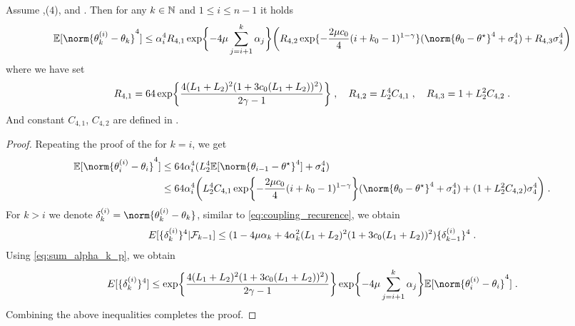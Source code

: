 \begin{lemma}
\label{lem:bound_fourth_moment_difference}
   Assume ,($4$),  and . Then for any $k \in \mathbb{N}$ and $1 \leq i \leq n-1$ it holds  
    \begin{equation}
        \PE[\norm{\theta_k^{(i)}-\theta_k}^4] \leq\alpha_i^4R_{4,1}\exp\biggl\{ -4\mu\sum_{j=i+1}^k\alpha_j\biggr\}\biggl(R_{4,2}\exp\{-\frac{2\mu c_0}{4}(i+k_0-1)^{1-\gamma}\}(\norm{\theta_{0}-\thetas}^4 + \sigma_4^4) + R_{4,3}\sigma_4^4\biggr)
    \end{equation}
    where we have set
    \begin{equation}
    \label{eq:def_R_41_R_42_R_43}
    R_{4,1} = 64\exp\biggl\{ \frac{4(L_1+L_2)^2(1+3c_0(L_1+L_2))^2)}{2\gamma-1}\biggr\}\;, \quad R_{4,2} = L_2^4C_{4,1}\;, \quad R_{4,3} =1+ L_2^2C_{4,2}\;.
    \end{equation}
    And constant $C_{4,1}$, $C_{4,2}$ are defined in .
    \end{lemma}
\begin{proof}
Repeating the proof of the  for $k = i$, we get
\begin{align}
        \PE[\norm{\theta_i^{(i)}-\theta_i}^4] &\leq64\alpha_i^4(L_2^4\PE[\norm{\theta_{i-1}-\thetas}^4] + \sigma_4^4) \\& \leq 64\alpha_i^4\biggl(L_2^4C_{4,1}\exp\biggl\{-\frac{2\mu c_0}{4}(i+k_0-1)^{1-\gamma}\biggr\}(\norm{\theta_{0}-\thetas}^4 + \sigma_4^4) + (1+L_2^2C_{4,2})\sigma_4^4\biggr)\eqsp.
\end{align}
For $k>i$ we denote $\delta_k^{(i)} = \norm{\theta_k^{(i)}-\theta_k}$, similar to \eqref{eq:coupling_recurence}, we obtain 
\begin{align}
E[\{\delta_k^{(i)}\}^4|\mathcal{F}_{k-1}] \leq (1 -4\mu\alpha_k + 4\alpha_k^2(L_1+L_2)^2(1+3c_0(L_1+L_2))^2)\{\delta_{k-1}^{(i)}\}^4\;.
\end{align}
Using 
\ref{eq:sum_alpha_k_p}, we obtain
\begin{equation}
    E[\{\delta_k^{(i)}\}^4]\leq \exp\biggl\{ \frac{4(L_1+L_2)^2(1+3c_0(L_1+L_2))^2)}{2\gamma-1}\biggr\}\exp\biggl\{ -4\mu\sum_{j=i+1}^k\alpha_j\biggr\} \PE[\norm{\theta_i^{(i)}-\theta_i}^4]\eqsp.
\end{equation}
Combining the above inequalities completes the proof.
\end{proof}


